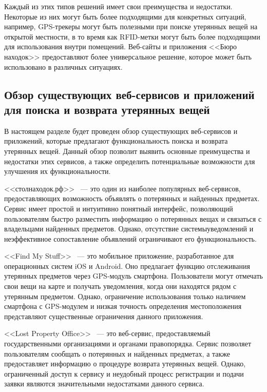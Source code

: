 \documentclass{mirea}
\begin{document}
Каждый из этих типов решений имеет свои преимущества и недостатки. Некоторые из них могут быть более подходящими для конкретных ситуаций, например, GPS-трекеры могут быть полезными при поиске утерянных вещей на открытой местности, в то время как RFID-метки могут быть более подходящими для использования внутри помещений. Веб-сайты и приложения <<Бюро находок>> предоставляют более универсальное решение, которое может быть использовано в различных ситуациях.

\subsection{Обзор существующих веб-сервисов и приложений для поиска и возврата утерянных вещей}

В настоящем разделе будет проведен обзор существующих веб-сервисов и приложений, которые предлагают функциональность поиска и возврата утерянных вещей. Данный обзор позволит выявить основные преимущества и недостатки этих сервисов, а также определить потенциальные возможности для улучшения их функциональности.

<<столнаходок.рф>>~\cite{bib:stol_nahodok} --- это один из наиболее популярных веб-сервисов, предоставляющих возможность объявлять о потерянных и найденных предметах. Сервис имеет простой и интуитивно понятный интерфейс, позволяющий пользователям быстро разместить информацию о потерянных вещах и связаться с владельцами найденных предметов. Однако, отсутствие системыуведомлений и неэффективное сопоставление объявлений ограничивают его функциональность.

<<Find My Stuff>>~\cite{bib:find_my_stuff} --- это мобильное приложение, разработанное для операционных систем iOS и Android. Оно предлагает функцию отслеживания утерянных предметов через GPS-модуль смартфона. Пользователи могут отмечать свои вещи на карте и получать уведомления, когда они находятся рядом с утерянным предметом. Однако, ограничение использования только наличием смартфона с GPS-модулем и низкая точность определения местоположения представляют существенные ограничения данного приложения.

<<Lost Property Office>>~\cite{bib:parliament_lost_and_found} --- это веб-сервис, предоставляемый государственными организациями и органами правопорядка. Сервис позволяет пользователям сообщать о потерянных и найденных предметах, а также предоставляет информацию о процедуре возврата утерянных вещей. Однако, ограниченный доступ к сервису и неудобный процесс регистрации и подачи заявки являются значительными недостатками данного сервиса.
\end{document}
